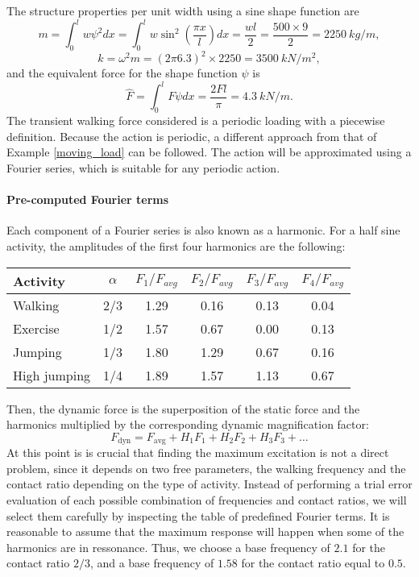 \begin{Answer}[ref={footfall_analysis}]
The structure properties per unit width using a sine shape function are
$$
m = \int_{0}^{l}w\psi^2dx = \int_{0}^{l}w\sin^2\left(\frac{\pi x}{l}\right)dx = \frac{wl}{2} = \frac{500\times9}{2} = \SI{2250}{kg/m},
$$
$$
k = \omega^2m = \left(2\pi6.3\right)^2\times2250 = \SI{3500}{kN/m^2},
$$
and the equivalent force for the shape function $\psi$ is
$$
\hat{F} = \int_{0}^{l}F\psi dx = \frac{2Fl}{\pi} = \SI{4.3}{kN/m}.
$$
The transient walking force considered is a periodic loading with a piecewise definition. Because the action is periodic, a different approach from that of Example \ref{moving_load} can be followed. The action will be approximated using a Fourier series, which is suitable for any periodic action.

\paragraph{Pre-computed Fourier terms}

Each component of a Fourier series is also known as a harmonic. For a half sine activity, the amplitudes of the first four harmonics are the following:

\begin{center}
\begin{tabular}{|l|c|cccc|}
    \hline
    Activity & $\alpha$ & $F_1/F_{avg}$ & $F_2/F_{avg}$ & $F_3/F_{avg}$ & $F_4/F_{avg}$ \\ \hline
    Walking  &    2/3   &   1.29   &   0.16   &   0.13   &   0.04   \\
    Exercise &    1/2   &   1.57   &   0.67   &   0.00   &   0.13   \\
    Jumping  &    1/3   &   1.80   &   1.29   &   0.67   &   0.16   \\
    High jumping & 1/4  &   1.89   &   1.57   &   1.13   &   0.67   \\ \hline
\end{tabular}
\end{center}
Then, the dynamic force is the superposition of the static force and the harmonics multiplied by the corresponding dynamic magnification factor:
$$
F_\text{dyn} = F_\text{avg} + H_1F_1 + H_2F_2 + H_3F_3 + \dots
$$
At this point is is crucial that finding the maximum excitation is not a direct problem, since it depends on two free parameters, the walking frequency and the contact ratio depending on the type of activity. Instead of performing a trial error evaluation of each possible combination of frequencies and contact ratios, we will select them carefully by inspecting the table of predefined Fourier terms. It is reasonable to assume that the maximum response will happen when some of the harmonics are in ressonance. Thus, we choose a base frequency of $2.1$ for the contact ratio $2/3$, and a base frequency of $1.58$ for the contact ratio equal to $0.5$.


\end{Answer}
